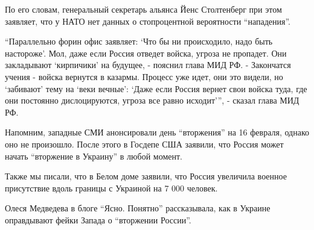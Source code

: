 По его словам, генеральный секретарь альянса Йенс Столтенберг при этом
заявляет, что у НАТО нет данных о стопроцентной вероятности
\enquote{нападения}.

\enquote{Параллельно форин офис заявляет: \enquote{Что бы ни происходило, надо
быть настороже}.  Мол, даже если Россия отведет войска, угроза не пропадет. Они
закладывают \enquote{кирпичики} на будущее, - пояснил глава МИД РФ. -
Закончатся учения - войска вернутся в казармы. Процесс уже идет, они это
видели, но \enquote{забивают} тему на \enquote{веки вечные}: \enquote{Даже если
Россия вернет свои войска туда, где они постоянно дислоцируются, угроза все
равно исходит}}, - сказал глава МИД РФ.

Напомним, западные СМИ анонсировали день \enquote{вторжения} на 16 февраля,
однако оно не произошло. После этого в Госдепе США заявили, что Россия может
начать \enquote{вторжение в Украину} в любой момент.

Также мы писали, что в Белом доме заявили, что Россия увеличила военное
присутствие вдоль границы с Украиной на 7 000 человек.

Олеся Медведева в блоге \enquote{Ясно. Понятно} рассказывала, как в Украине
оправдывают фейки Запада о \enquote{вторжении России}. 

